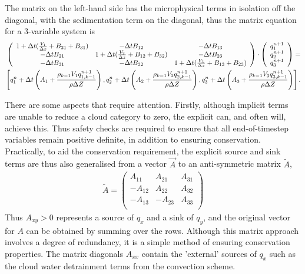 \documentclass[
a4paper,     %
12pt,        %
article,
onecolumn,   %
openany,     %
]{memoir}
\begin{document}
The matrix on the left-hand side has the microphysical terms in isolation off the diagonal,
with the sedimentation term on the diagonal, thus the matrix equation for a 3-variable 
system is
{\footnotesize
\begin{eqnarray}
\left(
\begin{array}{ccc}
1+ \Delta t(\frac{V_1}{\Delta z} + B_{21} + B_{31}) & -\Delta t B_{12}
& -\Delta t B_{13} \\
-\Delta t B_{21} & 1+ \Delta t(\frac{V_2}{\Delta z} + B_{12} + B_{32}) &
-\Delta t B_{23}  \\
-\Delta t B_{31} & -\Delta t B_{32} & 1+ \Delta t(\frac{V_3}{\Delta z} 
+ B_{13} + B_{23}) \\
\end{array}
\right) \cdot
\left(
\begin{array}{c}
q_1^{n+1} \\
q_2^{n+1} \\
q_3^{n+1} \\
\end{array}
\right)
= \nonumber \\
\newline
\left[ 
q_1^{n} + \Delta t \left(A_1 +
\frac{ \rho_{k-1} V_{1} q_{1,k-1}^{n+1}}{\rho \Delta Z} \right) 
,q_2^{n} + \Delta t \left(A_2 +
\frac{ \rho_{k-1} V_{2} q_{2,k-1}^{n+1}}{\rho \Delta Z} \right) 
,q_3^{n} + \Delta t \left(A_3 +
\frac{ \rho_{k-1} V_{3} q_{3,k-1}^{n+1}}{\rho \Delta Z} \right) 
\right].
\end{eqnarray}
}

There are some aspects that require attention.  Firstly, although implicit terms are unable 
to reduce a cloud category to zero, the explicit can, and often will, achieve this.  Thus 
safety checks are required to ensure that all end-of-timestep variables remain positive 
definite, in addition to ensuring conservation.  Practically, to aid the conservation requirement, 
the explicit source and sink terms are thus also generalised from a vector $\vec A$ to an 
anti-symmetric matrix  $\widetilde{A}$,
%
\begin{eqnarray}
\widetilde{A}=\left(
\begin{array}{ccc}
A_{11} & A_{21} & A_{31} \\
-A_{12} & A_{22} & A_{32} \\
-A_{13} & -A_{23} & A_{33} \\
\end{array}
\right)
\end{eqnarray}
%
Thus $A_{xy}>0$ represents a source of $q_{x}$ and a sink of $q_{y}$, and the original vector 
for $A$ can be obtained by summing over the rows. Although this matrix approach involves 
a degree of redundancy, it is a simple method of ensuring conservation properties. The matrix 
diagonals $A_{xx}$ contain the 'external' sources of $q_{x}$ such as the cloud water detrainment 
terms from the convection scheme.
\end{document}
